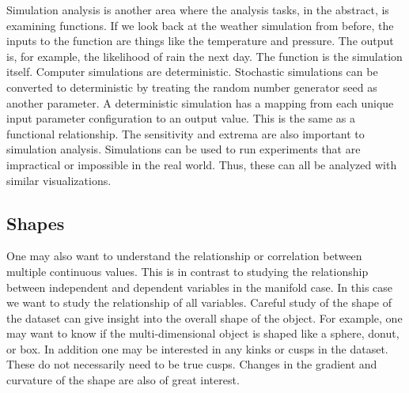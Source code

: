 Simulation analysis is another area where the analysis tasks, in the abstract,
is examining functions. If we look back at the weather simulation from before,
the inputs to the function are things like the temperature and pressure.
The output is, for example, the likelihood of rain the
next day. The function is the simulation itself. Computer simulations are
deterministic. Stochastic simulations can be converted to deterministic by
treating the random number generator seed as another parameter.  A
deterministic simulation has a mapping from each unique input parameter
configuration to an output value. This is the same as a functional
relationship. The sensitivity and extrema are also important to simulation
analysis. Simulations can be used to run experiments that are impractical or
impossible in the real world. Thus, these can all be analyzed with similar
visualizations.



\subsection{Shapes}
\label{sec:shapes}

One may also want to understand the relationship or correlation between
multiple continuous values. This is in contrast to studying the relationship
between independent and dependent variables in the manifold case. In this case
we want to study the relationship of all variables. Careful study of the shape
of the dataset can give insight into the overall shape of the object. For
example, one may want to know if the multi-dimensional object is shaped like a
sphere, donut, or box.
In addition one may be interested in any kinks or cusps in the dataset.
 These do not necessarily need to be true cusps. Changes in
the gradient and curvature of the shape are also of great interest.

